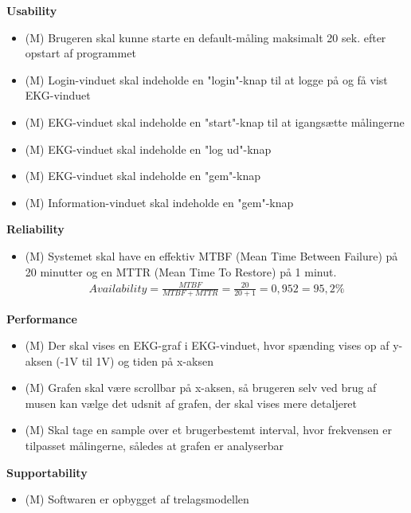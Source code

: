 \textbf{Usability}
\begin{itemize}
	\item (M) Brugeren skal kunne starte en default-måling maksimalt 20 sek. efter opstart af programmet
	\item (M) Login-vinduet skal indeholde en "login"\--knap til at logge på og få vist EKG-vinduet
	\item (M) EKG-vinduet skal indeholde en "start"\--knap til at igangsætte målingerne
	\item (M) EKG-vinduet skal indeholde en "log ud"\--knap
	\item (M) EKG-vinduet  skal indeholde en "gem"\--knap
	\item (M) Information-vinduet skal indeholde en "gem"\--knap
\end{itemize}

\textbf{Reliability}
\begin{itemize}
	\item (M) Systemet skal have en effektiv MTBF (Mean Time Between Failure) på 20 minutter og en MTTR (Mean Time To Restore) på 1 minut.
				\begin{align}
					Availability = \frac{MTBF}{MTBF+MTTR} = \frac{20}{20+1} = 0,952 = 95,2 \%
				\end{align}

\end{itemize}

\textbf{Performance}
\begin{itemize}
	\item (M) Der skal vises en EKG-graf i EKG-vinduet, hvor spænding vises op af y-aksen (-1V til 1V) og tiden på x-aksen
	\item (M) Grafen skal være scrollbar på x-aksen, så brugeren selv ved brug af musen kan vælge det udsnit af grafen, der skal vises mere detaljeret
	\item (M) Skal tage en sample over et brugerbestemt interval, hvor frekvensen  er tilpasset målingerne, således at grafen er analyserbar
\end{itemize}

\textbf{Supportability}
\begin{itemize}
	\item (M) Softwaren er opbygget af trelagsmodellen
\end{itemize}















